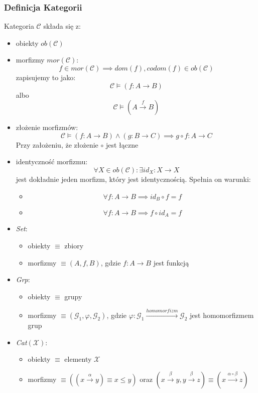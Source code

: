 \documentclass[11pt,a4paper]{article}
\begin{document}
\subsubsection{Definicja Kategorii}
Kategoria $\mathcal{C}$ składa się z:
\begin{itemize}
    \item obiekty $ob(\mathcal{C})$
    \item morfizmy $mor(\mathcal{C})$:
        \[
            f \in mor(\mathcal{C}) \implies dom(f), codom(f) \in ob(\mathcal{C})
        \]
        zapisujemy to jako:
        \[
            \mathcal{C} \models (f: A \rightarrow B)
        \]
        albo
        \[
            \mathcal{C} \models (A \xrightarrow{f} B)
        \]
    \item złożenie morfizmów:
        \[
            \mathcal{C} \models (f: A \rightarrow B) \wedge (g: B \rightarrow C) \implies g \circ f: A \rightarrow C
        \]
        Przy założeniu, że złożenie $\circ$ jest łączne
    \item identyczność morfizmu:
        \[
            \forall X \in ob(\mathcal{C}): \exists id_X: X \rightarrow X
        \]
        jest dokładnie jeden morfizm, który jest identycznością. Spełnia on warunki:
        \begin{itemize}
            \item \[
                \forall f: A \rightarrow B \implies id_B \circ f = f
            \]
            \item \[
                \forall f: A \rightarrow B \implies f \circ id_A = f
            \]
        \end{itemize}
\end{itemize}
\begin{itemize}
    \item \textit{Set}:
        \begin{itemize}
            \item obiekty $\equiv$ zbiory
            \item morfizmy $\equiv (A, f, B)$, gdzie $f: A \rightarrow B$ jest funkcją
        \end{itemize}
    \item \textit{Grp}:
        \begin{itemize}
            \item obiekty $\equiv$ grupy
            \item morfizmy $\equiv (\mathcal{G}_1, \varphi, \mathcal{G}_2)$, gdzie $\varphi: \mathcal{G}_1 \xrightarrow{homomorfizm} \mathcal{G}_2$ jest homomorfizmem grup
        \end{itemize}
    \item \textit{Cat$(\mathcal{X})$}:
        \begin{itemize}
            \item obiekty $\equiv$ elementy $\mathcal{X}$
            \item morfizmy $\equiv \left(\left(x \xrightarrow{\alpha} y\right) \equiv x \leq y \right)$ oraz $\left(x \xrightarrow{\beta} y, y \xrightarrow{\beta} z \right) \equiv \left(x \xrightarrow{\alpha \circ \beta} z\right)$
        \end{itemize}
\end{itemize}
\end{document}
